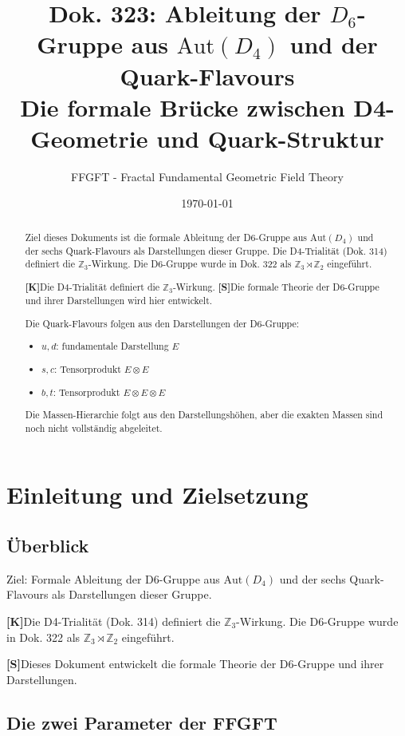 \documentclass[11pt,a4paper]{article}
\title{Dok. 323: Ableitung der $D_6$-Gruppe aus $\text{Aut}(D_4)$ und der Quark-Flavours\\
	\large Die formale Brücke zwischen D4-Geometrie und Quark-Struktur}
\author{FFGFT - Fractal Fundamental Geometric Field Theory}
\date{\today}
\newcommand{\Kstatus}{\textbf{[K]}}
\newcommand{\Sstatus}{\textbf{[S]}}
\begin{document}
	
	\maketitle
	
	\begin{abstract}
		Ziel dieses Dokuments ist die formale Ableitung der D6-Gruppe aus $\text{Aut}(D_4)$ und der sechs Quark-Flavours als Darstellungen dieser Gruppe. Die D4-Trialität (Dok. 314) definiert die $\mathbb{Z}_3$-Wirkung. Die D6-Gruppe wurde in Dok. 322 als $\mathbb{Z}_3 \rtimes \mathbb{Z}_2$ eingeführt.
		
		\Kstatus Die D4-Trialität definiert die $\mathbb{Z}_3$-Wirkung.
		\Sstatus Die formale Theorie der D6-Gruppe und ihrer Darstellungen wird hier entwickelt.
		
		Die Quark-Flavours folgen aus den Darstellungen der D6-Gruppe:
		\begin{itemize}
			\item $u, d$: fundamentale Darstellung $E$
			\item $s, c$: Tensorprodukt $E \otimes E$
			\item $b, t$: Tensorprodukt $E \otimes E \otimes E$
		\end{itemize}
		
		Die Massen-Hierarchie folgt aus den Darstellungshöhen, aber die exakten Massen sind noch nicht vollständig abgeleitet.
	\end{abstract}
	
	\tableofcontents
	\newpage
	
	\section{Einleitung und Zielsetzung}
	
	\subsection{Überblick}
	
	Ziel: Formale Ableitung der D6-Gruppe aus $\text{Aut}(D_4)$ und der sechs Quark-Flavours als Darstellungen dieser Gruppe.
	
	\Kstatus Die D4-Trialität (Dok. 314) definiert die $\mathbb{Z}_3$-Wirkung. Die D6-Gruppe wurde in Dok. 322 als $\mathbb{Z}_3 \rtimes \mathbb{Z}_2$ eingeführt.
	
	\Sstatus Dieses Dokument entwickelt die formale Theorie der D6-Gruppe und ihrer Darstellungen.
	
	\subsection{Die zwei Parameter der FFGFT}
	
\end{document}
